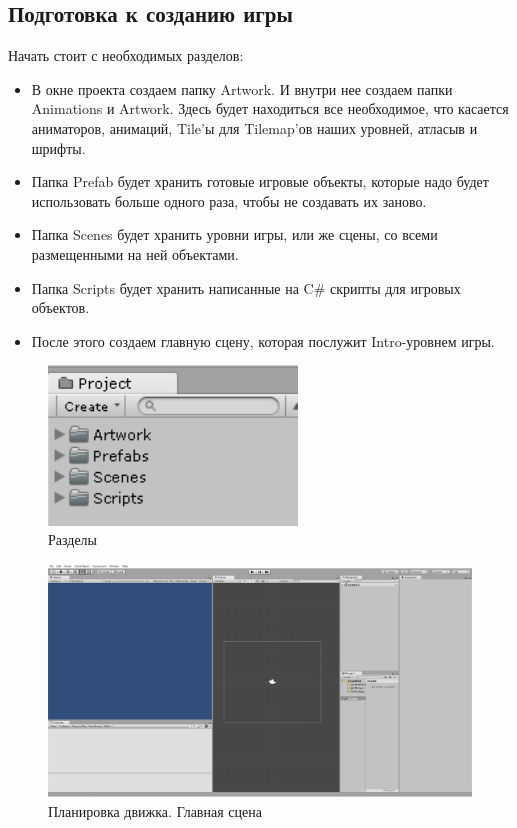 \documentclass[a4paper,12pt]{article}
\begin{document}
\newpage
\subsection{Подготовка к созданию игры}
Начать стоит с необходимых разделов:
\begin{itemize}
    \item В окне проекта создаем папку Artwork. И внутри нее создаем папки Animations и Artwork. Здесь будет находиться все необходимое, что касается аниматоров, анимаций, Tile'ы для Tilemap'ов наших уровней, атласыв и шрифты.
    \item Папка Prefab будет хранить готовые игровые объекты, которые надо будет использовать больше одного раза, чтобы не создавать их заново.
    \item Папка Scenes будет хранить уровни игры, или же сцены, со всеми размещенными на ней объектами.
    \item Папка Scripts будет хранить написанные на C\# скрипты для игровых объектов.
    \item После этого создаем главную сцену, которая послужит Intro-уровнем игры.
    \end{itemize}

\begin{figure}[h]
\centering
\includegraphics[width = 250px]{pictures/folders.png}
\caption{Разделы}
\end{figure}

\newpage
\begin{figure}[h]
\centering
\includegraphics[width = 450px]{pictures/layout.png}
\caption{Планировка движка. Главная сцена}
\end{figure}
\end{document}
